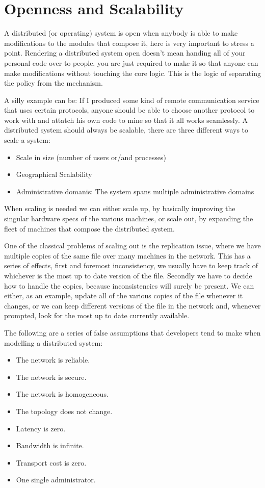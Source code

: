 \section{Openness and Scalability}
A distributed (or operating) system is open when anybody is able to make modifications to the modules that compose it, here is very important to stress a point. Rendering a distributed system open doesn't mean handing all of your personal code over to people, you are just required to make it so that anyone can make modifications without touching the core logic. This is the logic of separating the policy from the mechanism. 

A silly example can be: If I produced some kind of remote communication service that uses certain protocols, anyone should be able to choose another protocol to work with and attatch his own code to mine so that it all works seamlessly. A distributed system should always be scalable, there are three different ways to scale a system:
\begin{itemize}
    \item Scale in size (number of users or/and processes)
    \item Geographical Scalability
    \item Administrative domanis: The system spans multiple administrative domains
\end{itemize}
When scaling is needed we can either scale up, by basically improving the singular hardware specs of the various machines, or scale out, by expanding the fleet of machines that compose the distributed system.

One of the classical problems of scaling out is the replication issue, where we have multiple copies of the same file over many machines in the network. This has a series of effects, first and foremost inconsistency, we usually have to keep track of whichever is the most up to date version of the file. Secondly we have to decide how to handle the copies, because inconsistencies will surely be present. We can either, as an example, update all of the various copies of the file whenever it changes, or we can keep different versions of the file in the network and, whenever prompted, look for the most up to date currently available.

The following are a series of false assumptions that developers tend to make when modelling a distributed system:
\begin{itemize}
    \item The network is reliable.
    \item The network is secure.
    \item The network is homogeneous.
    \item The topology does not change.
    \item Latency is zero.
    \item Bandwidth is infinite.
    \item Transport cost is zero.
    \item One single administrator.
\end{itemize}
